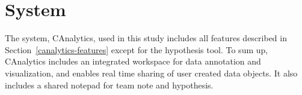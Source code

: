 \section{System}

The system, CAnalytics, used in this study includes all features described in Section~\ref{canalytics-features} except for the hypothesis tool. To sum up, CAnalytics includes an integrated workspace for data annotation and visualization, and enables real time sharing of user created data objects. It also includes a shared notepad for team note and hypothesis. 
